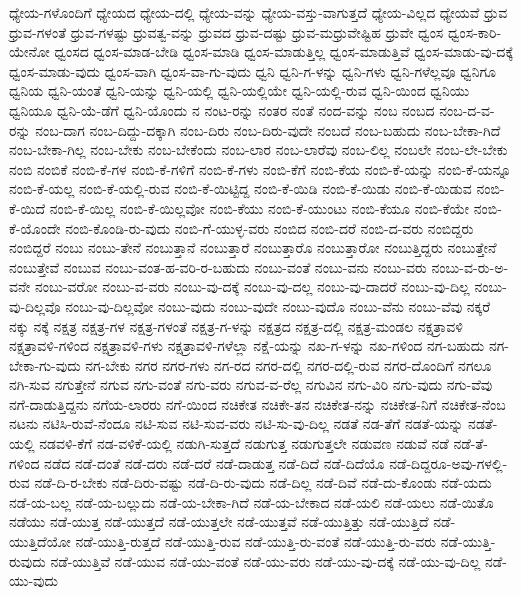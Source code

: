 {ಧ್ಯೇಯ-ಗಳೊಂದಿಗೆ
ಧ್ಯೇಯದ
ಧ್ಯೇಯ-ದಲ್ಲಿ
ಧ್ಯೇಯ-ವನ್ನು
ಧ್ಯೇಯ-ವಸ್ತು-ವಾಗುತ್ತದೆ
ಧ್ಯೇಯ-ವಿಲ್ಲದ
ಧ್ಯೇಯವೆ
ಧ್ರುವ
ಧ್ರುವ-ಗಳಂತೆ
ಧ್ರುವ-ಗಳಷ್ಟು
ಧ್ರುವತ್ವ-ವನ್ನು
ಧ್ರುವದ
ಧ್ರುವ-ದಷ್ಟು
ಧ್ರುವ-ಮಧ್ರುವೇಷ್ಟಿಹ
ಧ್ರುವೇ
ಧ್ವಂಸ
ಧ್ವಂಸ-ಕಾರಿ-ಯೇನೋ
ಧ್ವಂಸದ
ಧ್ವಂಸ-ಮಾಡ-ಬೇಡಿ
ಧ್ವಂಸ-ಮಾಡಿ
ಧ್ವಂಸ-ಮಾಡುತ್ತಿಲ್ಲ
ಧ್ವಂಸ-ಮಾಡುತ್ತಿವೆ
ಧ್ವಂಸ-ಮಾಡು-ವು-ದಕ್ಕೆ
ಧ್ವಂಸ-ಮಾಡು-ವುದು
ಧ್ವಂಸ-ವಾಗಿ
ಧ್ವಂಸ-ವಾ-ಗು-ವುದು
ಧ್ವನಿ
ಧ್ವನಿ-ಗ-ಳನ್ನು
ಧ್ವನಿ-ಗಳು
ಧ್ವನಿ-ಗಳೆಲ್ಲವೂ
ಧ್ವನಿಗೂ
ಧ್ವನಿಯ
ಧ್ವನಿ-ಯಂತೆ
ಧ್ವನಿ-ಯನ್ನು
ಧ್ವನಿ-ಯಲ್ಲಿ
ಧ್ವನಿ-ಯಲ್ಲಿಯೇ
ಧ್ವನಿ-ಯಲ್ಲಿ-ರುವ
ಧ್ವನಿ-ಯಿಂದ
ಧ್ವನಿಯು
ಧ್ವನಿಯೂ
ಧ್ವನಿ-ಯೆ-ಡೆಗೆ
ಧ್ವನಿ-ಯೊಂದು
ನ
ನಂಟ-ರನ್ನು
ನಂತರ
ನಂತೆ
ನಂದ-ವನ್ನು
ನಂಬ
ನಂಬದ
ನಂಬ-ದ-ವ-ರನ್ನು
ನಂಬ-ದಾಗ
ನಂಬ-ದಿದ್ದು-ದಕ್ಕಾಗಿ
ನಂಬ-ದಿರು
ನಂಬ-ದಿರು-ವುದೇ
ನಂಬದೆ
ನಂಬ-ಬಹುದು
ನಂಬ-ಬೇಕಾ-ಗಿದೆ
ನಂಬ-ಬೇಕಾ-ಗಿಲ್ಲ
ನಂಬ-ಬೇಕು
ನಂಬ-ಬೇಕೆಂದು
ನಂಬ-ಲಾರ
ನಂಬ-ಲಾರೆವು
ನಂಬ-ಲಿಲ್ಲ
ನಂಬಲೇ
ನಂಬ-ಲೇ-ಬೇಕು
ನಂಬಿ
ನಂಬಿಕೆ
ನಂಬಿ-ಕೆ-ಗಳ
ನಂಬಿ-ಕೆ-ಗಳಿಗೆ
ನಂಬಿ-ಕೆ-ಗಳು
ನಂಬಿ-ಕೆಗೆ
ನಂಬಿ-ಕೆಯ
ನಂಬಿ-ಕೆ-ಯನ್ನು
ನಂಬಿ-ಕೆ-ಯನ್ನೂ
ನಂಬಿ-ಕೆ-ಯಲ್ಲ
ನಂಬಿ-ಕೆ-ಯಲ್ಲಿ-ರುವ
ನಂಬಿ-ಕೆ-ಯಿಟ್ಟಿದ್ದ
ನಂಬಿ-ಕೆ-ಯಿಡಿ
ನಂಬಿ-ಕೆ-ಯಿಡು
ನಂಬಿ-ಕೆ-ಯಿಡುವ
ನಂಬಿ-ಕೆ-ಯಿದೆ
ನಂಬಿ-ಕೆ-ಯಿಲ್ಲ
ನಂಬಿ-ಕೆ-ಯಿಲ್ಲವೋ
ನಂಬಿ-ಕೆಯು
ನಂಬಿ-ಕೆ-ಯುಂಟು
ನಂಬಿ-ಕೆಯೂ
ನಂಬಿ-ಕೆಯೇ
ನಂಬಿ-ಕೆ-ಯೊಂದೇ
ನಂಬಿ-ಕೊಂಡಿ-ರು-ವುದು
ನಂಬಿ-ಗೆ-ಯುಳ್ಳ-ವರು
ನಂಬಿದ
ನಂಬಿ-ದರೆ
ನಂಬಿ-ದ-ವರು
ನಂಬಿದ್ದರು
ನಂಬಿದ್ದರೆ
ನಂಬು
ನಂಬು-ತೇನೆ
ನಂಬುತ್ತಾನೆ
ನಂಬುತ್ತಾರೆ
ನಂಬುತ್ತಾರೊ
ನಂಬುತ್ತಾರೋ
ನಂಬುತ್ತಿದ್ದರು
ನಂಬುತ್ತೇನೆ
ನಂಬುತ್ತೇವೆ
ನಂಬುವ
ನಂಬು-ವಂತ-ಹ-ವರಿ-ರ-ಬಹುದು
ನಂಬು-ವಂತೆ
ನಂಬು-ವನು
ನಂಬು-ವರು
ನಂಬು-ವ-ರು-ಅ-ವನೇ
ನಂಬು-ವರೋ
ನಂಬು-ವ-ವರು
ನಂಬು-ವು-ದಕ್ಕೆ
ನಂಬು-ವು-ದಲ್ಲ
ನಂಬು-ವು-ದಾದರೆ
ನಂಬು-ವು-ದಿಲ್ಲ
ನಂಬು-ವು-ದಿಲ್ಲವೊ
ನಂಬು-ವು-ದಿಲ್ಲವೋ
ನಂಬು-ವುದು
ನಂಬು-ವುದೇ
ನಂಬು-ವುದೊ
ನಂಬು-ವೆನು
ನಂಬು-ವೆವು
ನಕ್ಕರೆ
ನಕ್ಕು
ನಕ್ಕೆ
ನಕ್ಷತ್ರ
ನಕ್ಷತ್ರ-ಗಳ
ನಕ್ಷತ್ರ-ಗಳಂತೆ
ನಕ್ಷತ್ರ-ಗ-ಳನ್ನು
ನಕ್ಷತ್ರದ
ನಕ್ಷತ್ರ-ದಲ್ಲಿ
ನಕ್ಷತ್ರ-ಮಂಡಲ
ನಕ್ಷತ್ರಾವಳಿ
ನಕ್ಷತ್ರಾವಳಿ-ಗಳಿಂದ
ನಕ್ಷತ್ರಾವಳಿ-ಗಳು
ನಕ್ಷತ್ರಾವಳಿ-ಗಳೆಲ್ಲಾ
ನಕ್ಷೆ-ಯನ್ನು
ನಖ-ಗ-ಳನ್ನು
ನಖ-ಗಳಿಂದ
ನಗ-ಬಹುದು
ನಗ-ಬೇಕಾ-ಗು-ವುದು
ನಗ-ಬೇಕು
ನಗರ
ನಗರ-ಗಳು
ನಗ-ರದ
ನಗರ-ದಲ್ಲಿ
ನಗರ-ದಲ್ಲಿ-ರುವ
ನಗರ-ದೊಂದಿಗೆ
ನಗಲೂ
ನಗಿ-ಸುವ
ನಗುತ್ತೇನೆ
ನಗುವ
ನಗು-ವಂತೆ
ನಗು-ವರು
ನಗುವ-ವ-ರೆಲ್ಲ
ನಗುವಿನ
ನಗು-ವಿರಿ
ನಗು-ವುದು
ನಗು-ವೆವು
ನಗೆ-ದಾಡುತ್ತಿದ್ದನು
ನಗೆಯ-ಲಾರರು
ನಗೆ-ಯಿಂದ
ನಚಿಕೇತ
ನಚಿಕೇ-ತನ
ನಚಿಕೇತ-ನನ್ನು
ನಚಿಕೇತ-ನಿಗೆ
ನಚಿಕೇತ-ನೆಂಬ
ನಟನು
ನಟಿಸಿ-ರುವೆ-ನೆಂದೂ
ನಟಿ-ಸುವ
ನಟಿ-ಸುವ-ವರು
ನಟಿ-ಸು-ವು-ದಿಲ್ಲ
ನಡತೆ
ನಡ-ತೆಗೆ
ನಡತೆ-ಯನ್ನು
ನಡತೆ-ಯಲ್ಲಿ
ನಡವಳಿ-ಕೆಗೆ
ನಡ-ವಳಿಕೆ-ಯಲ್ಲಿ
ನಡುಗಿ-ಸುತ್ತದೆ
ನಡುಗುತ್ತ
ನಡುಗುತ್ತಲೇ
ನಡುವಣ
ನಡುವೆ
ನಡೆ
ನಡೆ-ತೆ-ಗಳಿಂದ
ನಡೆದ
ನಡೆ-ದಂತೆ
ನಡೆ-ದರು
ನಡೆ-ದರೆ
ನಡೆ-ದಾಡುತ್ತ
ನಡೆ-ದಿದೆ
ನಡೆ-ದಿದೆಯೊ
ನಡೆ-ದಿದ್ದರೂ-ಅವು-ಗಳಲ್ಲಿ-ರುವ
ನಡೆ-ದಿ-ರ-ಬೇಕು
ನಡೆ-ದಿರು-ವಷ್ಟು
ನಡೆ-ದಿ-ರು-ವುದು
ನಡೆ-ದಿಲ್ಲ
ನಡೆ-ದಿವೆ
ನಡೆ-ದು-ಕೊಂಡು
ನಡೆ-ಯದು
ನಡೆ-ಯ-ಬಲ್ಲ
ನಡೆ-ಯ-ಬಲ್ಲುದು
ನಡೆ-ಯ-ಬೇಕಾ-ಗಿದೆ
ನಡೆ-ಯ-ಬೇಕಾದ
ನಡೆ-ಯಲಿ
ನಡೆ-ಯಲು
ನಡೆ-ಯಿತೊ
ನಡೆಯು
ನಡೆ-ಯುತ್ತ
ನಡೆ-ಯುತ್ತದೆ
ನಡೆ-ಯುತ್ತಲೇ
ನಡೆ-ಯುತ್ತವೆ
ನಡೆ-ಯುತ್ತಿತ್ತು
ನಡೆ-ಯುತ್ತಿದೆ
ನಡೆ-ಯುತ್ತಿದೆಯೋ
ನಡೆ-ಯುತ್ತಿ-ರುತ್ತದೆ
ನಡೆ-ಯುತ್ತಿ-ರುವ
ನಡೆ-ಯುತ್ತಿ-ರು-ವಂತೆ
ನಡೆ-ಯುತ್ತಿ-ರು-ವರು
ನಡೆ-ಯುತ್ತಿ-ರುವುದು
ನಡೆ-ಯುತ್ತಿವೆ
ನಡೆ-ಯುವ
ನಡೆ-ಯು-ವಂತೆ
ನಡೆ-ಯು-ವರು
ನಡೆ-ಯು-ವು-ದಕ್ಕೆ
ನಡೆ-ಯು-ವು-ದಿಲ್ಲ
ನಡೆ-ಯು-ವುದು
}
